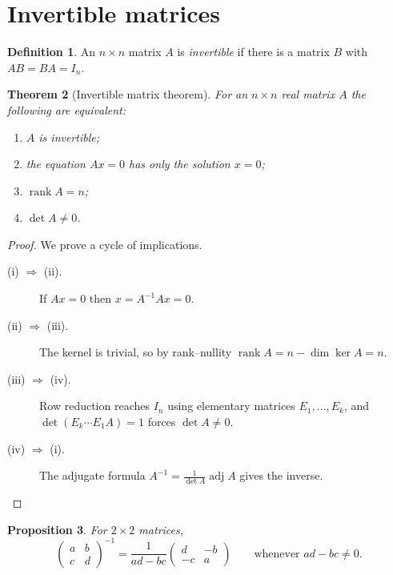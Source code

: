 \documentclass{article}
\newtheorem{theorem}{Theorem}[section]
\newtheorem{proposition}[theorem]{Proposition}
\theoremstyle{definition}
\newtheorem{definition}[theorem]{Definition}
\theoremstyle{remark}
\DeclareMathOperator{\rank}{rank}
\begin{document}
\section{Invertible matrices}

\begin{definition}
An $n \times n$ matrix $A$ is \emph{invertible} if there is a matrix $B$
with $AB = BA = I_n$.
\end{definition}

\begin{theorem}[Invertible matrix theorem]\label{thm:imt}
For an $n \times n$ real matrix $A$ the following are equivalent:
\begin{enumerate}[label=(\roman*)]
  \item $A$ is invertible;
  \item the equation $Ax = 0$ has only the solution $x = 0$;
  \item $\rank A = n$;
  \item $\det A \neq 0$.
\end{enumerate}
\end{theorem}

\begin{proof}
We prove a cycle of implications.
\begin{description}
  \item[(i) $\Rightarrow$ (ii).] If $Ax = 0$ then $x = A^{-1}Ax = 0$.
  \item[(ii) $\Rightarrow$ (iii).] The kernel is trivial, so by rank--nullity
        $\rank A = n - \dim\ker A = n$.
  \item[(iii) $\Rightarrow$ (iv).] Row reduction reaches $I_n$ using
        elementary matrices $E_1, \dots, E_k$, and
        $\det(E_k \cdots E_1 A) = 1$ forces $\det A \neq 0$.
  \item[(iv) $\Rightarrow$ (i).] The adjugate formula
        $A^{-1} = \frac{1}{\det A}\operatorname{adj} A$ gives the inverse.
        \qedhere
\end{description}
\end{proof}

\begin{proposition}
For $2 \times 2$ matrices,
\[
  \begin{pmatrix} a & b \\ c & d \end{pmatrix}^{-1}
  = \frac{1}{ad - bc}
    \begin{pmatrix} d & -b \\ -c & a \end{pmatrix}
  \qquad\text{whenever } ad - bc \neq 0.
\]
\end{proposition}
\end{document}
